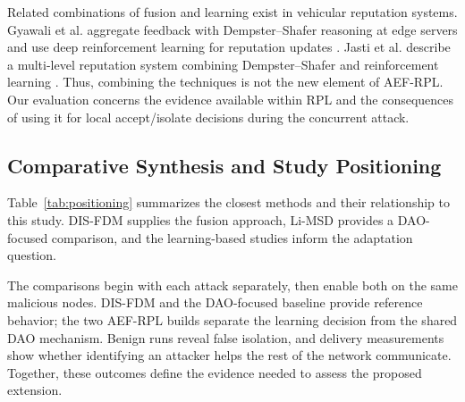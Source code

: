 Related combinations of fusion and learning exist in vehicular reputation systems. Gyawali et al. aggregate feedback with Dempster--Shafer reasoning at edge servers and use deep reinforcement learning for reputation updates \cite{gyawali2021}. Jasti et al. describe a multi-level reputation system combining Dempster--Shafer and reinforcement learning \cite{jasti2024}. Thus, combining the techniques is not the new element of AEF-RPL. Our evaluation concerns the evidence available within RPL and the consequences of using it for local accept/isolate decisions during the concurrent attack.

\subsection{Comparative Synthesis and Study Positioning}
Table~\ref{tab:positioning} summarizes the closest methods and their relationship to this study. DIS-FDM supplies the fusion approach, Li-MSD provides a DAO-focused comparison, and the learning-based studies inform the adaptation question.

The comparisons begin with each attack separately, then enable both on the same malicious nodes. DIS-FDM and the DAO-focused baseline provide reference behavior; the two AEF-RPL builds separate the learning decision from the shared DAO mechanism. Benign runs reveal false isolation, and delivery measurements show whether identifying an attacker helps the rest of the network communicate. Together, these outcomes define the evidence needed to assess the proposed extension.

